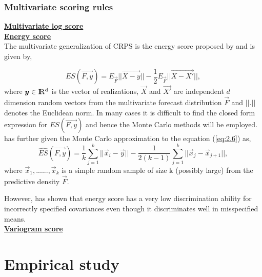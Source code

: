 \documentclass[graybox]{svmult}
\begin{document}
\subsubsection{Multivariate scoring rules}

\underline{\textbf{Multivariate log score}}\\

\underline{\textbf{Energy score}}\\

The multivariate generalization of CRPS  is the energy score proposed by \cite{gneiting2008} and is given by,

\begin{equation} \label{eq:2.6}
ES(\vec{F,y}) = E_{\vec{F}}||\vec{X-y}|| - \frac{1}{2}E_{\vec{F}}||\vec{X-X'}||,
\end{equation}
where $\vec{y} \in \rm I\!R^d$ is the vector of realizations, $\vec{X}$ and $\vec{X'}$  are independent $d$ dimension random vectors from the multivariate forecast distribution ${\vec{F}}$ and $||.||$ denotes the Euclidean norm. In many cases it is difficult to find the closed form expression for $ES(\vec{F,y})$ and hence the Monte Carlo methods will be employed. \cite{gneiting2008} has further given the Monte Carlo approximation to the equation (\ref{eq:2.6}) as,
\begin{equation}
\hat{ES}(\vec{F,y}) = \frac{1}{k}\displaystyle\sum_{j=1}^{k} ||\vec{x}_i-\vec{y}|| - \frac{1}{2(k-1)}\displaystyle\sum_{j=1}^{k} ||\vec{x}_j - \vec{x}_{j+1}||,
\end{equation}
where $\vec{x}_1,......,\vec{x}_k$ is a simple random sample of size k (possibly large) from the predictive density $\vec{F}$. 


However, \cite{Pinson2013} has shown that energy score has a very low discrimination ability for incorrectly specified  covariances even though it discriminates well in misspecified means. \\



\underline{\textbf{Variogram score}}\\




\section{Empirical study}
\end{document}
